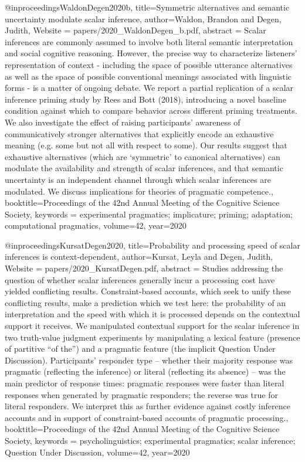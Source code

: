 {@inproceedings{WaldonDegen2020b,
  title={Symmetric alternatives and semantic uncertainty modulate scalar inference},
  author={Waldon, Brandon and Degen, Judith},
  Website = {papers/2020_WaldonDegen_b.pdf},
  abstract = {Scalar inferences are commonly assumed to involve both literal semantic interpretation and social cognitive reasoning. However, the precise way to characterize listeners’ representation of context - including the space of possible utterance alternatives as well as the space of possible conventional meanings associated with linguistic forms - is a matter of ongoing debate. We report a partial replication of a scalar inference priming study by Rees and Bott (2018), introducing a novel baseline condition against which to compare behavior across different priming treatments. We also investigate the effect of raising participants’ awareness of communicatively stronger alternatives that explicitly encode an exhaustive meaning (e.g. some but not all with respect to some). Our results suggest that exhaustive alternatives (which are ‘symmetric’ to canonical alternatives) can modulate the availability and strength of scalar inferences, and that semantic uncertainty is an independent channel through which scalar inferences are modulated. We discuss implications for theories of pragmatic competence.},
  booktitle={Proceedings of the 42nd Annual Meeting of the Cognitive Science Society},
  keywords = {experimental pragmatics; implicature; priming; adaptation; computational pragmatics},
  volume={42},
  year={2020}
}

@inproceedings{KursatDegen2020,
  title={Probability and processing speed of scalar inferences is context-dependent},
  author={Kursat, Leyla and Degen, Judith},
  Website = {papers/2020_KursatDegen.pdf},
  abstract = {Studies addressing the question of whether scalar inferences generally incur a processing cost have yielded conflicting results. Constraint-based accounts, which seek to unify these conflicting results, make a prediction which we test here: the probability of an interpretation and the speed with which it is processed depends on the contextual support it receives. We manipulated contextual support for the scalar inference in two truth-value judgment experiments by manipulating a lexical feature (presence of partitive “of the”) and a pragmatic feature (the implicit Question Under Discussion). Participants’ responder type – whether their majority response was pragmatic (reflecting the inference) or literal (reflecting its absence) – was the main predictor of response times: pragmatic responses were faster than literal responses when generated by pragmatic responders; the reverse was true for literal responders. We interpret this as further evidence against costly inference accounts and in support of constraint-based accounts of pragmatic processing.},
  booktitle={Proceedings of the 42nd Annual Meeting of the Cognitive Science Society},
  keywords = {psycholinguistics; experimental pragmatics; scalar inference; Question Under Discussion},
  volume={42},
  year={2020}
}

}
